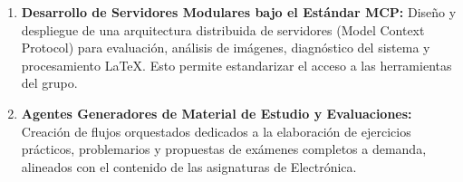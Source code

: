 \documentclass[12pt, a4paper]{article}
\begin{document}
\begin{enumerate}[label=\textbf{\arabic*.}, leftmargin=*]
    \item \textbf{Desarrollo de Servidores Modulares bajo el Estándar MCP:} 
    Diseño y despliegue de una arquitectura distribuida de servidores (Model Context Protocol) para evaluación, análisis de imágenes, diagnóstico del sistema y procesamiento LaTeX. Esto permite estandarizar el acceso a las herramientas del grupo.

    \item \textbf{Agentes Generadores de Material de Estudio y Evaluaciones:} 
    Creación de flujos orquestados dedicados a la elaboración de ejercicios prácticos, problemarios y propuestas de exámenes completos a demanda, alineados con el contenido de las asignaturas de Electrónica.

\end{enumerate}
\end{document}
